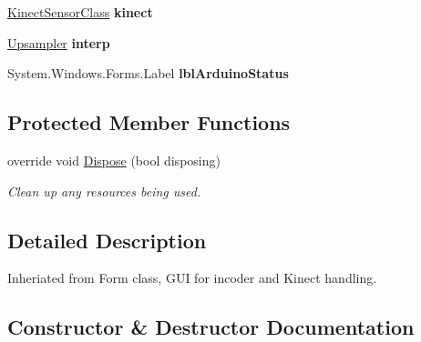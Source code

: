 \begin{DoxyCompactItemize}
\item 
\hyperlink{classkinect_expirement_1_1_kinect_sensor_class}{Kinect\+Sensor\+Class} {\bfseries kinect}\hypertarget{classkinect_expirement_1_1_kinect_form_a8a272c61595b87536d299d9f52ff77aa}{}\label{classkinect_expirement_1_1_kinect_form_a8a272c61595b87536d299d9f52ff77aa}

\item 
\hyperlink{classkinect_expirement_1_1_upsampler}{Upsampler} {\bfseries interp}\hypertarget{classkinect_expirement_1_1_kinect_form_af9a3d5384eda08f544c06550fa4d2774}{}\label{classkinect_expirement_1_1_kinect_form_af9a3d5384eda08f544c06550fa4d2774}

\item 
System.\+Windows.\+Forms.\+Label {\bfseries lbl\+Arduino\+Status}\hypertarget{classkinect_expirement_1_1_kinect_form_a36cbbdb03752a5ac8dc8fb6dd76973d1}{}\label{classkinect_expirement_1_1_kinect_form_a36cbbdb03752a5ac8dc8fb6dd76973d1}

\end{DoxyCompactItemize}
\subsection*{Protected Member Functions}
\begin{DoxyCompactItemize}
\item 
override void \hyperlink{classkinect_expirement_1_1_kinect_form_a906a228a66990023618b6cf919fcee44}{Dispose} (bool disposing)
\begin{DoxyCompactList}\small\item\em Clean up any resources being used. \end{DoxyCompactList}\end{DoxyCompactItemize}


\subsection{Detailed Description}
Inheriated from Form class, G\+UI for incoder and Kinect handling. 



\subsection{Constructor \& Destructor Documentation}
